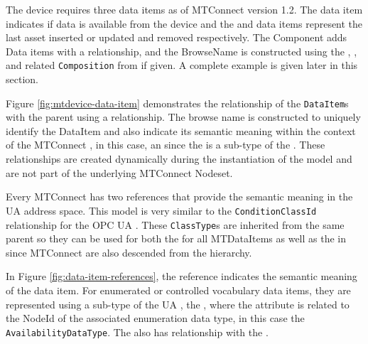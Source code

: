 The device requires three data items as of MTConnect version 1.2. The  data item indicates if data is available from the device and the  and  data items represent the last asset inserted or updated and removed respectively. The Component adds Data items with a  relationship, and the BrowseName is constructed using the , , and related \texttt{Composition} from  if given. A complete example is given later in this section.



Figure \ref{fig:mtdevice-data-item} demonstrates the relationship of the \texttt{Data\-Item}s with the parent  using a  relationship. The browse name is constructed to uniquely identify the DataItem and also indicate its semantic meaning within the context of the MTConnect , in this case, an  since the  is a sub-type of the . These relationships are created dynamically during the instantiation of the model and are not part of the underlying MTConnect Nodeset.

Every MTConnect  has two references that provide the semantic meaning in the UA address space. This model is very similar to the \texttt{Condition\-Class\-Id} relationship for the OPC UA . These \texttt{Class\-Type}s are inherited from the same parent so they can be used for both the  for all \glspl{MTDataItem} as well as the  in  since MTConnect  are also descended from the  hierarchy.



In Figure \ref{fig:data-item-references}, the  reference indicates the semantic meaning of the data item. For enumerated or controlled vocabulary data items, they are represented using a sub-type of the UA , the , where the  attribute is related to the NodeId of the associated enumeration data type, in this case the \texttt{Availability\-Data\-Type}. The  also has  relationship with the  .

